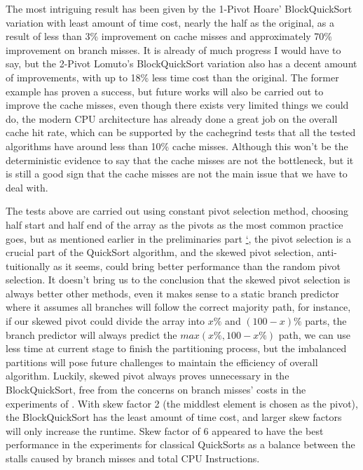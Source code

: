 \documentclass{article}
\begin{document}
The most intriguing result has been given by the 1-Pivot Hoare' BlockQuickSort variation with least amount of time cost, nearly the half as the original, as a result of less than 3\% improvement on cache misses and approximately 70\% improvement on branch misses.
It is already of much progress I would have to say, but the 2-Pivot Lomuto's BlockQuickSort variation also has a decent amount of improvements, with up to 18\% less time cost than the original.
The former example has proven a success, but future works will also be carried out to improve the cache misses, even though there exists very limited things we could do,
the modern CPU architecture has already done a great job on the overall cache hit rate, which can be supported by the cachegrind tests that all the tested algorithms have around less than 10\% cache misses.
Although this won't be the deterministic evidence to say that the cache misses are not the bottleneck, but it is still a good sign that the cache misses are not the main issue that we have to deal with.

The tests above are carried out using constant pivot selection method, choosing half start and half end of the array as the pivots as the most common practice goes,
but as mentioned earlier in the preliminaries part \hyperlink{ref:AnalysisOfBranchMissesInQuickSort}{`}, the pivot selection is a crucial part of the QuickSort algorithm, and the skewed pivot selection, anti-tuitionally as it seems, could bring better performance than the random pivot selection.
It doesn't bring us to the conclusion that the skewed pivot selection is always better other methods, even it makes sense to a static branch predictor where it assumes all branches will follow the correct majority path, for instance, if our skewed pivot could divide the array into $x\%$ and $(100-x)\%$ parts, the branch predictor will always predict the $max(x\%, 100-x\%)$ path,
we can use less time at current stage to finish the partitioning process, but the imbalanced partitions will pose future challenges to maintain the efficiency of overall algorithm. Luckily, skewed pivot always proves unnecessary in the BlockQuickSort, free from the concerns on branch misses' costs in the experiments of \cite{BlockQuickSort}. With skew factor 2 (the middlest element is chosen as the pivot), the BlockQuickSort has the least amount of time cost, and larger skew factors will only increase the runtime. Skew factor of 6 appeared to have the best performance in the experiments for classical QuickSorts as a balance between the stalls caused by branch misses and total CPU Instructions.
\end{document}
